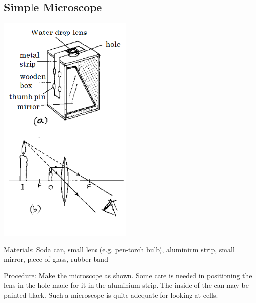\begin{multicols}{2}
\columnbreak

\subsection{Simple Microscope} %

\begin{center}
\includegraphics[width=0.49\textwidth]{./img/source/simple-microscope.png}
\end{center}

\begin{description*}
\item[Materials:]{Soda can, small lens (e.g. pen-torch bulb), aluminium strip, small mirror, piece of glass, rubber band}
\item[Procedure:]{Make the microscope as shown.
Some care is needed in
positioning the lens in the hole
made for it in the aluminium
strip. The inside of the can may be
painted black. Such a microscope
is quite adequate for looking at
cells.}
\end{description*}


\end{multicols}
